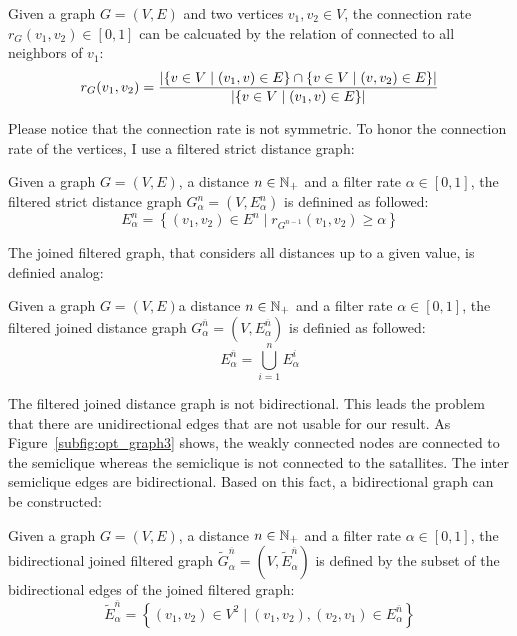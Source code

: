 \begin{envdef}
	Given a graph $G=(V,E)$ and two vertices $v_1,v_2 \in V$, the connection rate $r_G(v_1,v_2) \in \left[0,1\right]$ can be calcuated by the relation of connected to all neighbors of $v_1$:
	\begin{equation}
		r_G(v_1,v_2) = \frac{
			\left| \left\{ v \in V \mid (v_1, v) \in E \right\} \cap \left\{ v \in V \mid (v,v_2) \in E \right\} \right|
		}{
			\left| \left\{ v \in V \mid (v_1, v) \in E \right\} \right|
		}
	\end{equation}
\end{envdef}
Please notice that the connection rate is not symmetric. To honor the connection rate of the vertices, I use a filtered strict distance graph:
\begin{envdef}
	Given a graph $G=(V,E)$, a distance $n \in \mathbb{N}_+$ and a filter rate $\alpha \in \left[0,1\right]$, the filtered strict distance graph $G_\alpha^n=(V,E_\alpha^n)$ is definined as followed:
	\begin{equation}
		E_\alpha^n = \left\{ (v_1,v_2) \in E^n \mid r_{G^{n-1}}(v_1,v_2) \geq \alpha \right\}
	\end{equation}
\end{envdef}
The joined filtered graph, that considers all distances up to a given value, is definied analog:
\begin{envdef}
	Given a graph $G=(V,E)$a distance $n \in \mathbb{N}_+$ and a filter rate $\alpha \in \left[0,1\right]$, the filtered joined distance graph $G_\alpha^{\overline{n}}=(V,E_\alpha^{\overline{n}})$ is definied as followed:
	\begin{equation}
		E_\alpha^{\overline{n}} = \bigcup_{i=1}^n E_\alpha^i
	\end{equation}
\end{envdef}
The filtered joined distance graph is not bidirectional. This leads the problem that there are unidirectional edges that are not usable for our result. As Figure~\ref{subfig:opt_graph3} shows, the weakly connected nodes are connected to the semiclique whereas the semiclique is not connected to the satallites. The inter semiclique edges are bidirectional. Based on this fact, a bidirectional graph can be constructed:
\begin{envdef}
	Given a graph $G=(V,E)$, a distance $n \in \mathbb{N}_+$ and a filter rate $\alpha \in \left[0,1\right]$, the bidirectional joined filtered graph $\tilde{G}_\alpha^{\overline{n}}=(V,\tilde{E}_\alpha^{\overline{n}})$ is defined by the subset of the bidirectional edges of the joined filtered graph:
	\begin{equation}
		\tilde{E}_\alpha^{\overline{n}} = \left\{ (v_1,v_2) \in V^2 \mid (v_1,v_2),(v_2,v_1) \in E_\alpha^{\overline{n}} \right\}
	\end{equation}
\end{envdef}
